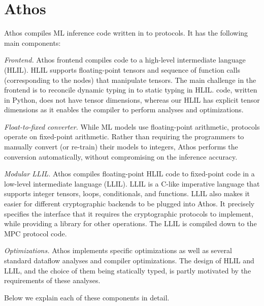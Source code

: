 \newcommand{\kw}[1]{{\ensuremath{\mathtt{#1}}}}
\newcommand{\ftext}[1]{\text{\small{#1}}}
\newcommand{\cond}[3]{\ensuremath{{{#1}\:?\:{#2}\::{#3}}}}
\newcommand{\forl}[4]{\ensuremath{\kw{for}\:{#1}\:\kw{in}\:[{#2}, {#3}]\:\kw{do}\:{#4}}}
\newcommand{\ite}[3]{\ensuremath{\kw{if}({#1}, {#2}, {#3})}}
\newcommand{\loops}[3]{\ensuremath{\kw{while}\:{#1} \leq {#2}\:\kw{do}\:{#3}}}

\section{Athos}
\label{sec:athos}
Athos compiles ML inference code written in \tensorflow to \mpc protocols. It has the following main components:

\begin{tiret}

\item \emph{Frontend.} Athos frontend compiles \tensorflow code to a
high-level intermediate language (HLIL). HLIL supports floating-point
tensors and sequence of function calls (corresponding to the
\tensorflow nodes) that manipulate tensors. The main challenge in the
frontend is to reconcile dynamic typing in \tensorflow to static
typing in HLIL. \tensorflow code, written in Python, does not have
tensor dimensions, whereas our HLIL has explicit tensor dimensions as
it enables the compiler to perform analyses and optimizations.

\item \emph{Float-to-fixed converter.} While ML models use
floating-point arithmetic, \mpc protocols operate on fixed-point
arithmetic. Rather than requiring the programmers to manually convert
(or re-train) their models to integers, Athos performs the conversion
automatically, without compromising on the inference accuracy.

\item \emph{Modular LLIL.} Athos compiles floating-point HLIL code to 
fixed-point code in a low-level
intermediate language (LLIL). LLIL is a C-like imperative language
that supports integer tensors, loops, conditionals, and functions. LLIL
also makes it easier for different cryptographic backends to be
plugged into Athos. It precisely specifies the interface that it
requires the cryptographic protocols to implement, while providing a
 library for other operations. The LLIL is compiled down to
the MPC protocol code.

\item \emph{Optimizations.} Athos implements 
 \mpc specific optimizations as well as
several standard dataflow
  analyses and compiler optimizations.
 The design of HLIL and LLIL, and the choice of them being
  statically typed, is partly motivated by the requirements of these
  analyses.

Below we explain each of these components in detail.
\end{tiret}
